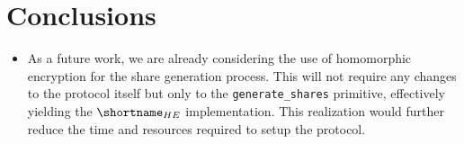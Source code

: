\section{Conclusions}\label{sect:conclusions}

\begin{itemize}
	\item As a future work, we are already considering the use of homomorphic encryption for the share generation process. This will not require any changes to the protocol itself but only to the \texttt{generate\_shares} primitive, effectively yielding the $\shortname_{HE}$ implementation. This realization would further reduce the time and resources required to setup the \shortname protocol.
\end{itemize}